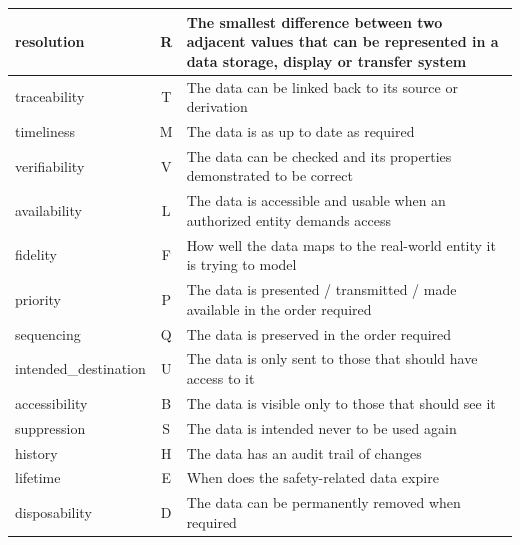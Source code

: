 \begin{longtable}{|L{}|C{}|L{}|}
	{\Gls{resolution}} & R & {The smallest difference between two adjacent values that can be represented in a data storage, display or transfer system}\\\hline
	{\Gls{traceability}} & T & {The data can be linked back to its source or derivation}\\\hline
	{\Gls{timeliness}} & M & {The data is as up to date as required}\\\hline
	{\Gls{verifiability}} & V & {The data can be checked and its properties demonstrated to be correct}\\\hline
	{\Gls{availability}} & L & {The data is accessible and usable when an authorized entity demands access}\\\hline
	{\Gls{fidelity}} & F & {How well the data maps to the real-world entity it is trying to model}\\\hline
	{\Gls{priority}} & P & {The data is presented / transmitted / made available in the order required}\\\hline
	{\Gls{sequencing}} & Q & {The data is preserved in the order required}\\\hline
	{\Gls{intended_destination}} & U & {The data is only sent to those that should have access to it}\\\hline
	{\Gls{accessibility}} & B & {The data is visible only to those that should see it}\\\hline
	{\Gls{suppression}} & S & {The data is intended never to be used again}\\\hline
	{\Gls{history}} & H & {The data has an audit trail of changes}\\\hline
	{\Gls{lifetime}} & E & {When does the safety-related data expire}\\\hline
	{\Gls{disposability}} & D & {The data can be permanently removed when required}\\\hline

\end{longtable}
